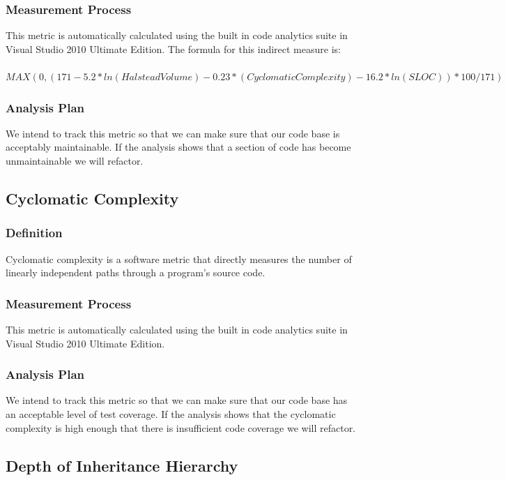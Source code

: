 \documentclass[12pt]{article}
\begin{document}
\subsubsection{Measurement Process}
This metric is automatically calculated using the built in code analytics suite in Visual Studio 2010 Ultimate Edition. The formula for this indirect measure is:\\
\\
 \footnotesize{$MAX(0,(171 - 5.2 * ln(Halstead Volume) - 0.23 * (Cyclomatic Complexity) - 16.2 * ln(SLOC))*100 / 171)$}
\\
\subsubsection{Analysis Plan}
We intend to track this metric so that we can make sure that our code base is acceptably maintainable. If the analysis shows that a section of code has become unmaintainable we will refactor.

\subsection{Cyclomatic Complexity}
\subsubsection{Definition}
Cyclomatic complexity is a software metric that directly measures the number of linearly independent paths through a program's source code.

\subsubsection{Measurement Process}
This metric is automatically calculated using the built in code analytics suite in Visual Studio 2010 Ultimate Edition.

\subsubsection{Analysis Plan}
We intend to track this metric so that we can make sure that our code base has an acceptable level of test coverage. If the analysis shows that the cyclomatic complexity is high enough that there is insufficient code coverage we will refactor.

\subsection{Depth of Inheritance Hierarchy}
\end{document}
